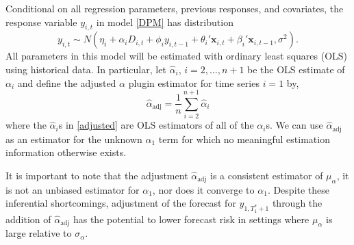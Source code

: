 \documentclass[11pt]{article}
\newcommand{\x}{\textbf{x}}
\begin{document}
Conditional on all regression parameters, previous responses, and covariates, 
the response variable $y_{i,t}$ in model \eqref{DPM} has distribution 
$$
  y_{i,t} 
    \sim N(\eta_i + \alpha_iD_{i,t} + \phi_i y_{i,t-1} + \theta_i'\x_{i,t} 
      + \beta_i'\x_{i,t-1}, \sigma^2).
$$
All parameters in this model will be estimated with ordinary least squares 
(OLS) using historical data.  In particular, let $\hat{\alpha}_i$, 
$i = 2, \ldots, n+1$ be the OLS estimate of $\alpha_i$ and define the 
adjusted $\alpha$ plugin estimator for time series $i=1$ by,
\begin{equation} \label{adjusted}
  \hat{\alpha}_{\text{adj}} = \frac{1}{n}\sum_{i=2}^{n+1}\hat{\alpha}_i
\end{equation}
where the $\hat{\alpha}_i$s in \eqref{adjusted} are OLS estimators of all of 
the $\alpha_i$s.  We can use $\hat{\alpha}_{\text{adj}}$ as an estimator for 
the unknown $\alpha_1$ term for which no meaningful estimation information 
otherwise exists.  

It is important to note that the adjustment $\hat{\alpha}_{\text{adj}}$ 
is a consistent estimator of $\mu_\alpha$, it is not an unbiased 
estimator for $\alpha_1$, nor does it converge to $\alpha_1$.  
Despite these inferential shortcomings, adjustment of the forecast for 
$y_{1,T_1^*+1}$ through the addition of $\hat{\alpha}_{\text{adj}}$ has 
the potential to lower forecast risk in settings where $\mu_\alpha$ is 
large relative to $\sigma_\alpha$.  
\end{document}

